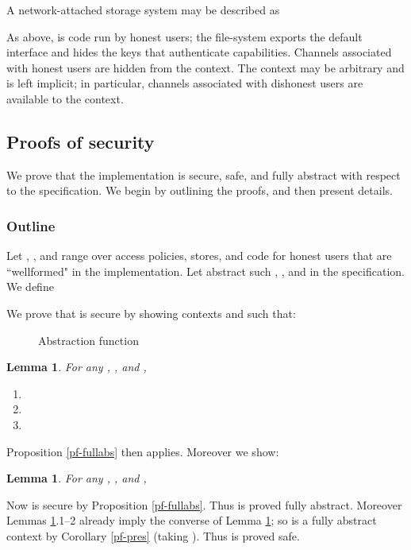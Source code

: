 \documentclass[10pt]{article}
\newtheorem{lemma}[theorem]{Lemma}
\begin{document}
A network-attached storage system may be described as 

As above,  is code run by honest users; the file-system exports the default interface and hides the keys that authenticate capabilities. Channels associated with honest users are hidden from the context. The context may be arbitrary and is left implicit; in particular, channels associated with dishonest users are available to the context.

\subsection{Proofs of security}
We prove that the implementation is secure, safe, and fully abstract with respect to the specification. We begin by outlining the proofs, and then present details.
\subsubsection{Outline}
Let , , and  range over access policies, stores, and code for honest users that are ``wellformed" in the implementation. Let  abstract such , , and  in the specification. We define

We prove that  is secure by showing contexts  and  such that:
\begin{figure}
\hspace{-0.6cm}\fbox{\parbox{13.2cm}{\small





}}
\caption{Abstraction function}
   \label{fig:abs-s}
\end{figure}
\begin{lemma}\label{static-lemma} For any , , and ,
\begin{enumerate}
\item 
\item 
\item 
\par 
\end{enumerate}
\end{lemma}
Proposition \ref{pf-fullabs} then applies. Moreover we show:
\begin{lemma}\label{static-safetylemma} For any , , and , 

\end{lemma}
Now  is secure by Proposition \ref{pf-fullabs}. Thus  is proved fully abstract. Moreover Lemmas \ref{static-lemma}.1--2 already imply the converse of Lemma \ref{static-safetylemma}; so  is a fully abstract context by Corollary \ref{pf-pres} (taking ). Thus  is proved safe. 
\end{document}

